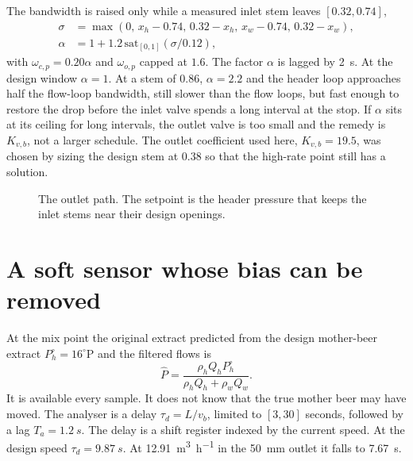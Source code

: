 \documentclass[conference,a4paper]{IEEEtran}
\newcommand{\degP}{^{\circ}\mathrm{P}}
\begin{document}
The bandwidth is raised only while a measured inlet stem leaves $[0.32,0.74]$,
\begin{equation}
\label{eq:alpha}
\begin{aligned}
\sigma &= \max(0,\,x_h-0.74,\,0.32-x_h,\,x_w-0.74,\,0.32-x_w),\\
\alpha &= 1+1.2\,\mathrm{sat}_{[0,1]}(\sigma/0.12),
\end{aligned}
\end{equation}
with $\omega_{c,p}=0.20\alpha$ and $\omega_{o,p}$ capped at $1.6$. The factor $\alpha$ is lagged by \SI{2}{s}. At the design window $\alpha=1$. At a stem of $0.86$, $\alpha=2.2$ and the header loop approaches half the flow-loop bandwidth, still slower than the flow loops, but fast enough to restore the drop before the inlet valve spends a long interval at the stop. If $\alpha$ sits at its ceiling for long intervals, the outlet valve is too small and the remedy is $K_{v,b}$, not a larger schedule. The outlet coefficient used here, $K_{v,b}=19.5$, was chosen by sizing the design stem at $0.38$ so that the high-rate point still has a solution.

\begin{figure}[!t]
\centering
{}
\caption{The outlet path. The setpoint is the header pressure that keeps the inlet stems near their design openings.}
\label{fig:auth}
\end{figure}

\section{A soft sensor whose bias can be removed}
At the mix point the original extract predicted from the design mother-beer extract $P_h^\circ=16\degP$ and the filtered flows is
\begin{equation}
\label{eq:soft}
\hat{P}=\frac{\rho_h Q_h P_h^\circ}{\rho_h Q_h+\rho_w Q_w}.
\end{equation}
It is available every sample. It does not know that the true mother beer may have moved. The analyser is a delay $\tau_d=L/v_b$, limited to $[3,30]$ seconds, followed by a lag $T_a=\SI{1.2}{s}$. The delay is a shift register indexed by the current speed. At the design speed $\tau_d=\SI{9.87}{s}$. At \SI{12.91}{\cubic\metre\per\hour} in the \SI{50}{mm} outlet it falls to \SI{7.67}{s}.
\end{document}
